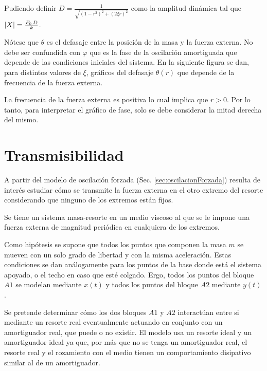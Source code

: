 \documentclass[a5paper,12pt,twoside]{book}
\begin{document}
Pudiendo definir $D=\frac{1}{\sqrt{(1-r^2)^2+(2 \xi r)^2}}$ como la amplitud dinámica tal que ${\left| {X} \right|}=\frac{F_0 \, D}{k}$.

Nótese que $\theta$ es el defasaje entre la posición de la masa y la fuerza externa. No debe ser confundida con $\varphi$ que es la fase de la oscilación amortiguada que depende de las condiciones iniciales del sistema. En la siguiente figura se dan, para distintos valores de $\xi$, gráficos del defasaje $\theta(r)$ que depende de la frecuencia de la fuerza externa.

\begin{center}
    \def\svgwidth{\linewidth}
    
\end{center}

La frecuencia de la fuerza externa es positiva lo cual implica que $r>0$. Por lo tanto, para interpretar el gráfico de fase, solo se debe considerar la mitad derecha del mismo.


\section{Transmisibilidad}

A partir del modelo de oscilación forzada (Sec. \ref{sec:oscilacionForzada}) resulta de interés estudiar cómo se transmite la fuerza externa en el otro extremo del resorte considerando que ninguno de los extremos están fijos.

Se tiene un sistema masa-resorte en un medio viscoso al que se le impone una fuerza externa de magnitud periódica en cualquiera de los extremos.

\begin{center}
    \def\svgwidth{0.8\linewidth}
    
\end{center}

Como hipótesis se supone que todos los puntos que componen la masa $m$ se mueven con un solo grado de libertad y con la misma aceleración. Estas condiciones se dan análogamente para los puntos de la base donde está el sistema apoyado, o el techo en caso que esté colgado. Ergo, todos los puntos del bloque $A1$ se modelan mediante $x(t)$ y todos los puntos del bloque $A2$ mediante $y(t)$.

Se pretende determinar cómo los dos bloques $A1$ y $A2$ interactúan entre si mediante un resorte real eventualmente actuando en conjunto con un amortiguador real, que puede o no existir. El modelo usa un resorte ideal y un amortiguador ideal ya que, por más que no se tenga un amortiguador real, el resorte real y el rozamiento con el medio tienen un comportamiento disipativo similar al de un amortiguador.
\end{document}
